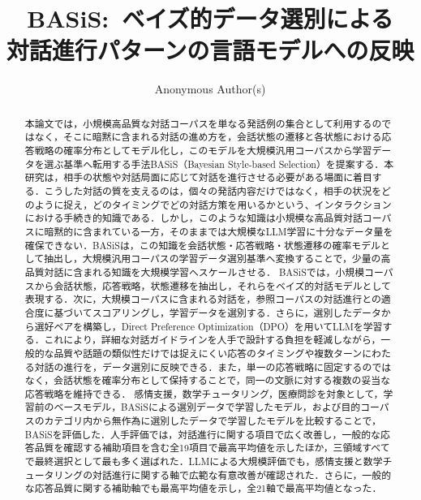 \documentclass[manuscript,review,anonymous]{acmart}
\makeatletter
\newcommand{\ActivateCJKForPDFLaTeX}{%
  \CJKnospace
  \CJK@envStart{}{UTF8}{min}%
}
\makeatother
\begin{document}
\ActivateCJKForPDFLaTeX

\title[BASiS: Dialogue Progression Transfer]{%
  \texorpdfstring{BASiS:~ベイズ的データ選別による\\対話進行パターンの言語モデルへの反映}%
  {BASiS: Transferring Dialogue Progression to Language Models through Bayesian Data Selection}}

\author{Anonymous Author(s)}
\renewcommand{\shortauthors}{Anonymous Author(s)}

\begin{abstract}
本論文では，小規模高品質な対話コーパスを単なる発話例の集合として利用するのではなく，そこに暗黙に含まれる対話の進め方を，会話状態の遷移と各状態における応答戦略の確率分布としてモデル化し，このモデルを大規模汎用コーパスから学習データを選ぶ基準へ転用する手法BASiS（Bayesian Style-based Selection）を提案する．本研究は，相手の状態や対話局面に応じて対話を進行させる必要がある場面に着目する．こうした対話の質を支えるのは，個々の発話内容だけではなく，相手の状況をどのように捉え，どのタイミングでどの対話方策を用いるかという、インタラクションにおける手続き的知識である．しかし，このような知識は小規模な高品質対話コーパスに暗黙的に含まれている一方，そのままでは大規模なLLM学習に十分なデータ量を確保できない．BASiSは，この知識を会話状態・応答戦略・状態遷移の確率モデルとして抽出し，大規模汎用コーパスの学習データ選別基準へ変換することで，少量の高品質対話に含まれる知識を大規模学習へスケールさせる．
BASiSでは，小規模コーパスから会話状態，応答戦略，状態遷移を抽出し，それらをベイズ的対話モデルとして表現する．次に，大規模コーパスに含まれる対話を，参照コーパスの対話進行との適合度に基づいてスコアリングし，学習データを選別する．さらに，選別したデータから選好ペアを構築し，Direct Preference Optimization（DPO）を用いてLLMを学習する．これにより，詳細な対話ガイドラインを人手で設計する負担を軽減しながら，一般的な品質や話題の類似性だけでは捉えにくい応答のタイミングや複数ターンにわたる対話の進行を，データ選別に反映できる．また，単一の応答戦略に固定するのではなく，会話状態を確率分布として保持することで，同一の文脈に対する複数の妥当な応答戦略を維持できる．
感情支援，数学チュータリング，医療問診を対象として，学習前のベースモデル，BASiSによる選別データで学習したモデル，および目的コーパスのカテゴリ内から無作為に選別したデータで学習したモデルを比較することで，BASiSを評価した．人手評価では，対話進行に関する項目で広く改善し，一般的な応答品質を確認する補助項目を含む全19項目で最高平均値を示したほか，三領域すべてで最終選択として最も多く選ばれた．LLMによる大規模評価でも，感情支援と数学チュータリングの対話進行に関する軸で広範な有意改善が確認された．さらに，一般的な応答品質に関する補助軸でも最高平均値を示し，全21軸で最高平均値となった．
\end{abstract}
\end{document}
